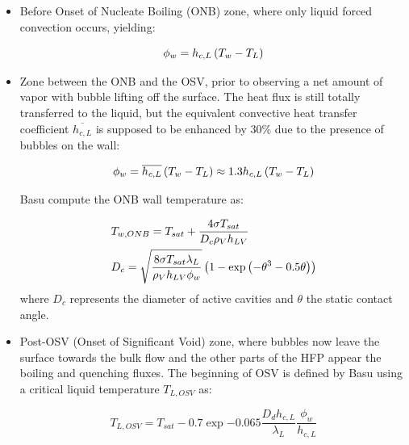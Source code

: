 \begin{itemize}
\item Before Onset of Nucleate Boiling (ONB) zone, where only liquid forced convection occurs, yielding:

\begin{equation}
\phi_{w}=h_{c,L} \left( T_{w}-T_{L} \right)
\label{eq:basu_hfp_preONB}
\end{equation}

\item Zone between the ONB and the OSV, prior to observing a net amount of vapor with bubble lifting off the surface. The heat flux is still totally transferred to the liquid, but the equivalent convective heat transfer coefficient $\overline{h_{c,L}}$ is supposed to be enhanced by 30\% due to the presence of bubbles on the wall:

\begin{equation}
\phi_{w}=\overline{h_{c,L}} \left( T_{w}-T_{L} \right)\approx 1.3 h_{c,L}\left( T_{w}-T_{L} \right)
\label{eq:basu_hfp_postONB}
\end{equation}

Basu \etal compute the ONB wall temperature as:

\begin{align}
&T_{w, ONB}= T_{sat} + \frac{4 \sigma T_{sat}}{D_{c}\rho_{V} h_{LV}}\\
%
&D_{c}= \sqrt{\frac{8 \sigma T_{sat} \lambda_{L}}{\rho_{V} h_{LV} \phi_{w}}}\parth{ 1- \exp{ - \theta^{3} - 0.5 \theta}  }
\label{eq:basu_hfp_ONB}
\end{align}
where $D_{c}$ represents the diameter of active cavities and $\theta$ the static contact angle.

\item Post-OSV (Onset of Significant Void) zone, where bubbles now leave the surface towards the bulk flow and the other parts of the HFP appear \ie the boiling and quenching fluxes. The beginning of OSV is defined by Basu \etal using a critical liquid temperature $T_{L,OSV}$ as:

\begin{equation}
T_{L,OSV}=T_{sat}-0.7\exp{-0.065 \frac{D_{d}h_{c,L}}{\lambda_{L}}}\frac{\phi_{w}}{h_{c,L}}
\label{eq:basu_hfp_TLOSV}
\end{equation}

\end{itemize}


